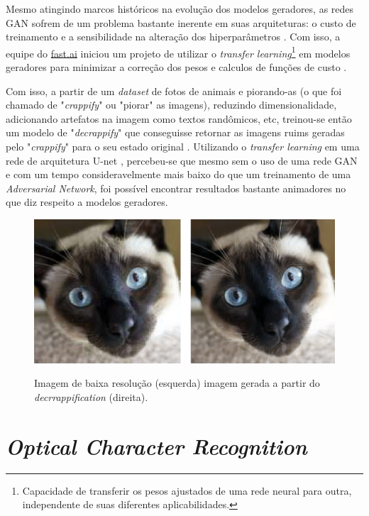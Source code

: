 Mesmo atingindo marcos históricos na evolução dos modelos geradores, as redes GAN sofrem de um problema bastante inerente em suas arquiteturas: o custo de treinamento e a sensibilidade na alteração dos hiperparâmetros \cite{f8-decrappification}. Com isso, a equipe do \href{fast.ai}{fast.ai} iniciou um projeto de utilizar o \textit{transfer learning}\footnote{Capacidade de transferir os pesos ajustados de uma rede neural para outra, independente de suas diferentes aplicabilidades.} em modelos geradores para minimizar a correção dos pesos e calculos de funções de custo \cite{f8-decrappification}.

Com isso, a partir de um \textit{dataset} de fotos de animais e piorando-as (o que foi chamado de "\textit{crappify}" ou "piorar" as imagens), reduzindo dimensionalidade, adicionando artefatos na imagem como textos randômicos, etc, treinou-se então um modelo de "\textit{decrappify}" que conseguisse retornar as imagens ruims geradas pelo "\textit{crappify}" para o seu estado original \cite{f8-decrappification}. Utilizando o \textit{transfer learning} em uma rede de arquitetura U-net \cite{u-net}, percebeu-se que mesmo sem o uso de uma rede GAN e com um tempo consideravelmente mais baixo do que um treinamento de uma \textit{Adversarial Network}, foi possível encontrar resultados bastante animadores no que diz respeito a modelos geradores.

\begin{figure}[H]
  \centering
  \caption{Imagem de baixa resolução (esquerda) imagem gerada a partir do \textit{decrrappification} (direita).}
  \includegraphics[scale=0.3]{figuras/cats-decrappify.png}
  \label{fig:cats-decrappify}
\end{figure}

\section{\textit{Optical Character Recognition}}

